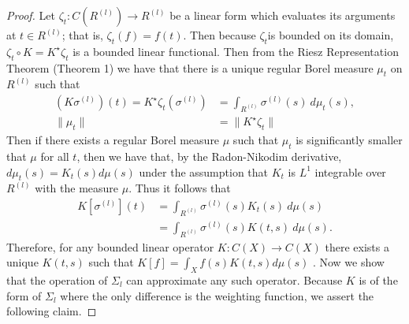 \documentclass{article}
\begin{document}
\begin{proof} Let $\zeta_t :C(R^{(l)})\to R^{(l)}$ be a linear form which evaluates its arguments at $t\in R^{(l)}$; that is, $\zeta_t(f) = f(t)$.  Then because $\zeta_t$is bounded on its domain, $\zeta_t\circ K = K^\star\zeta_t$ is a bounded linear functional. Then from the Riesz Representation Theorem (Theorem 1) we have that there is a unique regular Borel measure $\mu_t$ on $R^{(l)}$ such that 
\begin{equation}
\begin{aligned}
    \left(K\sigma^{(l)}\right)(t) = K^\star \zeta_t\left(\sigma^{(l)}\right) &= \int_{R^{(l)}} \sigma^{(l)}(s)\ d\mu_t(s), \\
    \|\mu_t\| &= \|K^\star \zeta_t\| 
\end{aligned}
\end{equation}
Then if there exists a regular Borel measure $\mu$ such that $\mu_t$ is significantly smaller that $\mu$ for all $t$, then we have that, by the Radon-Nikodim derivative, $d\mu_t(s) = K_t(s)d\mu(s)$ under the assumption that $K_t$ is $L^1$ integrable over $R^{(l)}$ with the measure $\mu$. Thus it follows that 
\begin{equation}
\begin{aligned}
K\left[\sigma^{(l)}\right](t) &= \int_{R^{(l)}} \sigma^{(l)}(s)K_t(s)\ d\mu(s) \\
&= \int_{R^{(l)}} \sigma^{(l)}(s)K(t,s)\  d\mu(s).
\end{aligned}
\end{equation}
Therefore, for any bounded linear operator $K:C(X)\to C(X)$ there exists a unique $K(t,s)$ such that $K[f] = \int_X f(s)K(t,s) d\mu(s)$ . Now we show that the operation of $\Sigma_l$ can approximate any such operator. Because $K$ is of the form of $\Sigma_l$ where the only difference is the weighting function, we assert the following claim.


\end{proof}
\end{document}
